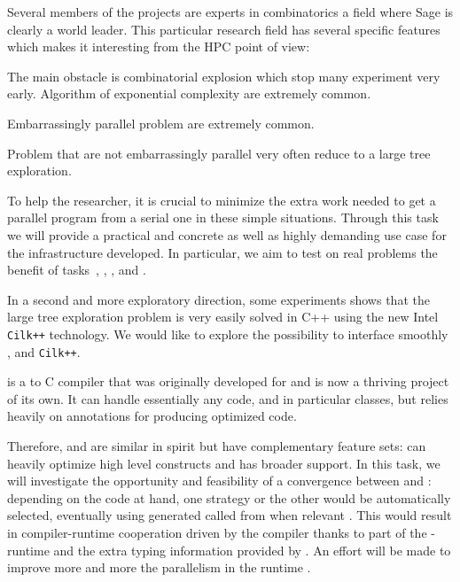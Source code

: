 \begin{workpackage}[id=hpc,wphases=0-48,
  title=High Performance Computing,
  PSRM=1, %
  LLRM=12, %
  SARM=18, %
  UKRM=1, %
  UBRM=1, %
  UJFRM=12]
\begin{tasklist}
\begin{task}[title=HPC infrastructure for combinatorics,id=hpc-combi]
  Several members of the projects are experts in combinatorics a field where
  Sage is clearly a world leader. This particular research field has several
  specific features which makes it interesting from the HPC point of view:
  \begin{compactitem}
  \item The main obstacle is combinatorial explosion which stop many
    experiment very early. Algorithm of exponential complexity are extremely
    common.
  \item Embarrassingly parallel problem are extremely common.
  \item Problem that are not embarrassingly parallel very often reduce to a
    large tree exploration.
  \end{compactitem}
  To help the researcher, it is crucial to minimize the extra work needed to
  get a parallel program from a serial one in these simple situations. Through
  this task we will provide a practical and concrete as well as highly
  demanding use case for the infrastructure developed. In particular, we aim
  to test on real problems the benefit of tasks~,
  , ,
  and .

  In a second and more exploratory direction, some experiments shows that the
  large tree exploration problem is very easily solved in C++ using the new
  Intel \texttt{Cilk++} technology. We would like to explore the possibility to
  interface smoothly \Pythran, \Cython and \texttt{Cilk++}.
\end{task}

\begin{task}[title=Pythran-Cython convergence,id=pythran-cython]

  \Cython is a \Python to C compiler that was originally developed for
  \Sage and is now a thriving project of its own. It can handle
  essentially any \Python code, and in particular classes, but relies
  heavily on annotations for producing optimized code.

  Therefore, \Pythran and \Cython are similar in spirit but have
  complementary feature sets: \Pythran can heavily optimize high level
  \Numpy constructs and \Cython has broader \Python support. In this
  task, we will investigate the opportunity and feasibility of a
  convergence between \Cython and \Pythran: depending on the code at
  hand, one strategy or the other would be automatically selected,
  eventually using \Pythran generated called from \Cython when
  relevant . This would result in compiler-runtime
  cooperation driven by the \Cython compiler thanks to part of the
  \Pythran-runtime and the extra typing information provided by \Cython. An
  effort will be made to improve more and more the parallelism in the
  \Pythran runtime .


\end{task}
\end{tasklist}
\end{workpackage}
